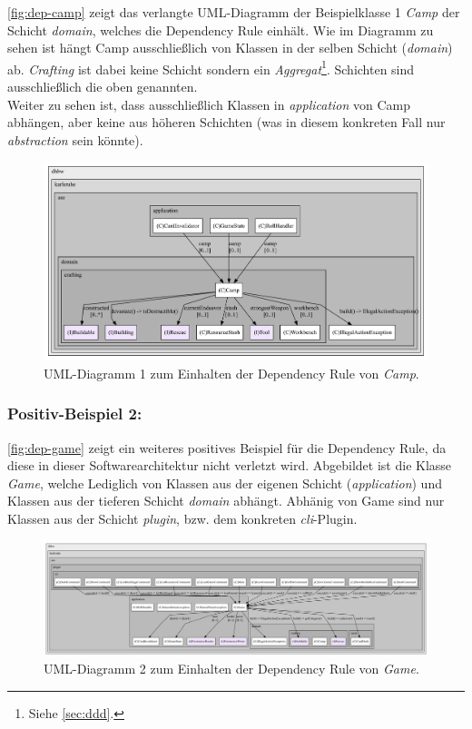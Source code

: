 \autoref{fig:dep-camp} zeigt das verlangte UML-Diagramm der Beispielklasse 1 \textit{Camp} der Schicht \textit{domain}, 
welches die Dependency Rule einhält. Wie im Diagramm zu sehen ist hängt Camp ausschließlich von 
Klassen in der selben Schicht (\textit{domain}) ab. 
\textit{Crafting} ist dabei keine Schicht sondern ein \textit{Aggregat}\footnote{Siehe \autoref{sec:ddd}.}. 
Schichten sind ausschließlich die oben genannten. \\ 
Weiter zu sehen ist, dass ausschließlich Klassen in \textit{application} von Camp abhängen, aber keine 
aus höheren Schichten (was in diesem konkreten Fall nur \textit{abstraction} sein könnte).

\begin{figure}[H]
	\centering
	\includegraphics[width=1.\textwidth]{Bilder/Camp_structure.pdf} 
	\caption{UML-Diagramm 1 zum Einhalten der Dependency Rule von \textit{Camp}. }
	\label{fig:dep-camp}
\end{figure} 

\subsubsection{Positiv-Beispiel 2:}

\autoref{fig:dep-game} zeigt ein weiteres positives Beispiel für die Dependency Rule, 
da diese in dieser Softwarearchitektur nicht verletzt wird. Abgebildet ist die Klasse \textit{Game}, 
welche Lediglich von Klassen aus der eigenen Schicht (\textit{application}) und Klassen aus der tieferen 
Schicht \textit{domain} abhängt. Abhänig von Game sind nur Klassen aus der Schicht \textit{plugin},
bzw. dem konkreten \textit{cli}-Plugin. 

\begin{figure}[H]
	\centering
	\includegraphics[width=1.05\textwidth]{Bilder/Game_structure.pdf} 
	\caption{UML-Diagramm 2 zum Einhalten der Dependency Rule von \textit{Game}. }
	\label{fig:dep-game}
\end{figure} 


